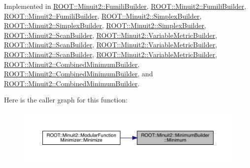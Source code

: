 Implemented in \mbox{\hyperlink{classROOT_1_1Minuit2_1_1FumiliBuilder_a6e598ea8d57750ec860595ba494bb501}{R\+O\+O\+T\+::\+Minuit2\+::\+Fumili\+Builder}}, \mbox{\hyperlink{classROOT_1_1Minuit2_1_1FumiliBuilder_aa1889039835b4117cb2a9b7d49e4f6dd}{R\+O\+O\+T\+::\+Minuit2\+::\+Fumili\+Builder}}, \mbox{\hyperlink{classROOT_1_1Minuit2_1_1FumiliBuilder_aa1889039835b4117cb2a9b7d49e4f6dd}{R\+O\+O\+T\+::\+Minuit2\+::\+Fumili\+Builder}}, \mbox{\hyperlink{classROOT_1_1Minuit2_1_1SimplexBuilder_a82c52765929e3f4a41b1abe1473d4140}{R\+O\+O\+T\+::\+Minuit2\+::\+Simplex\+Builder}}, \mbox{\hyperlink{classROOT_1_1Minuit2_1_1SimplexBuilder_a68ea5d16ee89941e9674eb673dbde593}{R\+O\+O\+T\+::\+Minuit2\+::\+Simplex\+Builder}}, \mbox{\hyperlink{classROOT_1_1Minuit2_1_1SimplexBuilder_a68ea5d16ee89941e9674eb673dbde593}{R\+O\+O\+T\+::\+Minuit2\+::\+Simplex\+Builder}}, \mbox{\hyperlink{classROOT_1_1Minuit2_1_1ScanBuilder_ad53e9711dc8a63958845ac6e6eb5250f}{R\+O\+O\+T\+::\+Minuit2\+::\+Scan\+Builder}}, \mbox{\hyperlink{classROOT_1_1Minuit2_1_1VariableMetricBuilder_a56d18a37b8643611ff80875b91915784}{R\+O\+O\+T\+::\+Minuit2\+::\+Variable\+Metric\+Builder}}, \mbox{\hyperlink{classROOT_1_1Minuit2_1_1ScanBuilder_a24547691823b9f0977e6b23b6d084e7a}{R\+O\+O\+T\+::\+Minuit2\+::\+Scan\+Builder}}, \mbox{\hyperlink{classROOT_1_1Minuit2_1_1VariableMetricBuilder_af39ef2e38ec2bf3d94fa78fe0ed9a64a}{R\+O\+O\+T\+::\+Minuit2\+::\+Variable\+Metric\+Builder}}, \mbox{\hyperlink{classROOT_1_1Minuit2_1_1ScanBuilder_a24547691823b9f0977e6b23b6d084e7a}{R\+O\+O\+T\+::\+Minuit2\+::\+Scan\+Builder}}, \mbox{\hyperlink{classROOT_1_1Minuit2_1_1VariableMetricBuilder_af39ef2e38ec2bf3d94fa78fe0ed9a64a}{R\+O\+O\+T\+::\+Minuit2\+::\+Variable\+Metric\+Builder}}, \mbox{\hyperlink{classROOT_1_1Minuit2_1_1CombinedMinimumBuilder_a44282b6271b536b7fc6b80af16ac67ef}{R\+O\+O\+T\+::\+Minuit2\+::\+Combined\+Minimum\+Builder}}, \mbox{\hyperlink{classROOT_1_1Minuit2_1_1CombinedMinimumBuilder_a5439a04b01ff94a8f790443b867d6e53}{R\+O\+O\+T\+::\+Minuit2\+::\+Combined\+Minimum\+Builder}}, and \mbox{\hyperlink{classROOT_1_1Minuit2_1_1CombinedMinimumBuilder_a5439a04b01ff94a8f790443b867d6e53}{R\+O\+O\+T\+::\+Minuit2\+::\+Combined\+Minimum\+Builder}}.

Here is the caller graph for this function\+:
\nopagebreak
\begin{figure}[H]
\begin{center}
\leavevmode
\includegraphics[width=350pt]{d3/dc3/classROOT_1_1Minuit2_1_1MinimumBuilder_aefaa624436afa8195af1f3393a35981f_icgraph}
\end{center}
\end{figure}
\mbox{\label{classROOT_1_1Minuit2_1_1MinimumBuilder_aefaa624436afa8195af1f3393a35981f}} 
